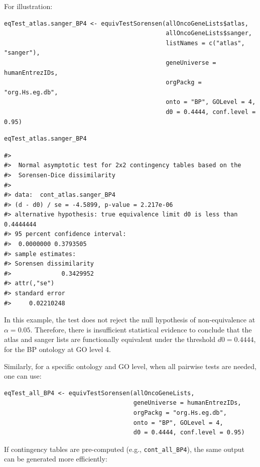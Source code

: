 For illustration:

\begin{verbatim}
eqTest_atlas.sanger_BP4 <- equivTestSorensen(allOncoGeneLists$atlas, 
                                             allOncoGeneLists$sanger,
                                             listNames = c("atlas", "sanger"),
                                             geneUniverse = humanEntrezIDs, 
                                             orgPackg = "org.Hs.eg.db", 
                                             onto = "BP", GOLevel = 4,
                                             d0 = 0.4444, conf.level = 0.95)
\end{verbatim}

\begin{verbatim}
eqTest_atlas.sanger_BP4
\end{verbatim}

\begin{verbatim}
#> 
#>  Normal asymptotic test for 2x2 contingency tables based on the
#>  Sorensen-Dice dissimilarity
#> 
#> data:  cont_atlas.sanger_BP4
#> (d - d0) / se = -4.5899, p-value = 2.217e-06
#> alternative hypothesis: true equivalence limit d0 is less than 0.4444444
#> 95 percent confidence interval:
#>  0.0000000 0.3793505
#> sample estimates:
#> Sorensen dissimilarity 
#>              0.3429952 
#> attr(,"se")
#> standard error 
#>     0.02210248
\end{verbatim}

In this example, the test does not reject the null hypothesis of non-equivalence at \(\alpha = 0.05\). Therefore, there is insufficient statistical evidence to conclude that the atlas and sanger lists are functionally equivalent under the threshold \(d0 = 0.4444\), for the BP ontology at GO level 4.

Similarly, for a specific ontology and GO level, when all pairwise tests are needed, one can use:

\begin{verbatim}
eqTest_all_BP4 <- equivTestSorensen(allOncoGeneLists,
                                    geneUniverse = humanEntrezIDs, 
                                    orgPackg = "org.Hs.eg.db", 
                                    onto = "BP", GOLevel = 4,
                                    d0 = 0.4444, conf.level = 0.95)
\end{verbatim}

If contingency tables are pre-computed (e.g., \texttt{cont\_all\_BP4}), the same output can be generated more efficiently:

